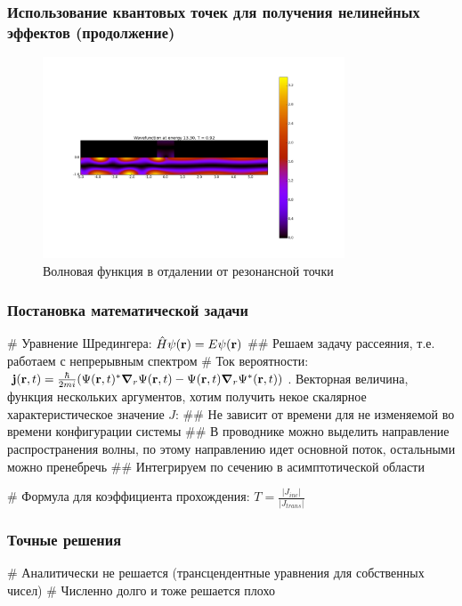 \documentclass{beamer}
\begin{document}
\begin{frame}[fragile]
\frametitle{Использование квантовых точек для получения нелинейных эффектов (продолжение)}
\begin{figure}
\includegraphics[width=0.8\textwidth]{high-transmission.png}
\caption{Волновая функция в отдалении от резонансной точки}
\end{figure}
\end{frame}


\begin{frame}[fragile]
\frametitle{Постановка математической задачи}
\begin{easylist}[itemize]
# Уравнение Шредингера: $\hat{H} \psi(\vb{r}) = E \psi(\vb{r})$
## Решаем задачу рассеяния, т.е. работаем с непрерывным спектром
# Ток вероятности: $\vb{j}(\vb{r}, t) = \frac{\hbar}{2 m i} (\Psi(\vb{r}, t)^* \grad_r{\Psi(\vb{r}, t)} - \Psi(\vb{r}, t) \grad_r{\Psi^*(\vb{r}, t))}$. Векторная величина, функция нескольких аргументов, хотим получить некое скалярное характеристическое значение $J$:
## Не зависит от времени для не изменяемой во времени конфигурации системы
## В проводнике можно выделить направление распространения волны, по этому направлению идет основной поток, остальными можно пренебречь
## Интегрируем по сечению в асимптотической области

# Формула для коэффициента прохождения: $T = \frac{|J_{inc}|}{|J_{trans}|}$
\end{easylist}
\end{frame}


\begin{frame}[fragile]
\frametitle{Точные решения}
\begin{easylist}[itemize]
# Аналитически не решается (трансцендентные уравнения для собственных чисел)
# Численно долго и тоже решается плохо
\end{easylist}
\end{frame}
\end{document}
